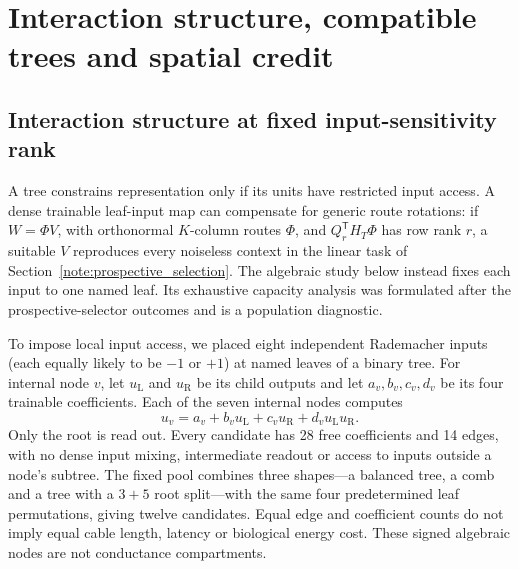 \section{Interaction structure, compatible trees and spatial credit}
\label{note:interactions_boolean}

\subsection{Interaction structure at fixed input-sensitivity rank}
\label{note:interaction_structure}

A tree constrains representation only if its units have restricted input access. A dense trainable leaf-input map can compensate for generic route rotations: if $W=\Phi V$, with orthonormal $K$-column routes $\Phi$, and $Q_r^{\mathsf T}H_T\Phi$ has row rank $r$, a suitable $V$ reproduces every noiseless context in the linear task of Section~\ref{note:prospective_selection}. The algebraic study below instead fixes each input to one named leaf. Its exhaustive capacity analysis was formulated after the prospective-selector outcomes and is a population diagnostic.

To impose local input access, we placed eight independent Rademacher inputs
(each equally likely to be $-1$ or $+1$) at named leaves of a binary tree.
For internal node $v$, let $u_{\mathrm L}$ and $u_{\mathrm R}$ be its
child outputs and let $a_v,b_v,c_v,d_v$ be its four trainable coefficients.
Each of the seven internal nodes computes
\begin{equation}
 u_v=a_v+b_vu_{\mathrm L}+c_vu_{\mathrm R}
       +d_vu_{\mathrm L}u_{\mathrm R}.
 \label{eq:s_multiaffine_node}
\end{equation}
Only the root is read out. Every candidate has 28 free coefficients and 14
edges, with no dense input mixing, intermediate readout or access to inputs
outside a node's subtree.
The fixed pool combines three shapes---a balanced tree, a comb and a tree
with a $3+5$ root split---with the same four predetermined leaf permutations,
giving twelve candidates. Equal edge
and coefficient counts do not imply equal cable length, latency or biological
energy cost. These signed algebraic nodes are not conductance compartments.

